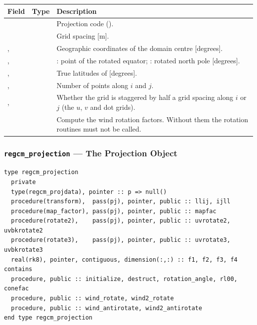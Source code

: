 \begin{longtable}{L{3.5cm} L{3cm} L{7.5cm}}
  \toprule
  \textbf{Field} & \textbf{Type} & \textbf{Description} \\
  \midrule
  \endhead
  \bottomrule
  \endfoot
   &  & Projection code (). \\
   &  & Grid spacing [m]. \\
  ,  &  &
    Geographic coordinates of the domain centre [degrees]. \\
  ,  &  &
    : point of the rotated equator; : rotated
    north pole [degrees]. \\
  ,  &  &
    True latitudes of  [degrees]. \\
  ,  &  &
    Number of points along $i$ and $j$. \\
  ,  &  &
    Whether the grid is staggered by half a grid spacing along $i$ or $j$
    (the $u$, $v$ and dot grids). \\
   &  &
    Compute the wind rotation factors. Without them the rotation routines
    must not be called. \\
\end{longtable}

\subsubsection{\texttt{regcm\_projection} --- The Projection Object}

\begin{lstlisting}
type regcm_projection
  private
  type(regcm_projdata), pointer :: p => null()
  procedure(transform),  pass(pj), pointer, public :: llij, ijll
  procedure(map_factor), pass(pj), pointer, public :: mapfac
  procedure(rotate2),    pass(pj), pointer, public :: uvrotate2, uvbkrotate2
  procedure(rotate3),    pass(pj), pointer, public :: uvrotate3, uvbkrotate3
  real(rk8), pointer, contiguous, dimension(:,:) :: f1, f2, f3, f4
contains
  procedure, public :: initialize, destruct, rotation_angle, rl00, conefac
  procedure, public :: wind_rotate, wind2_rotate
  procedure, public :: wind_antirotate, wind2_antirotate
end type regcm_projection
\end{lstlisting}

